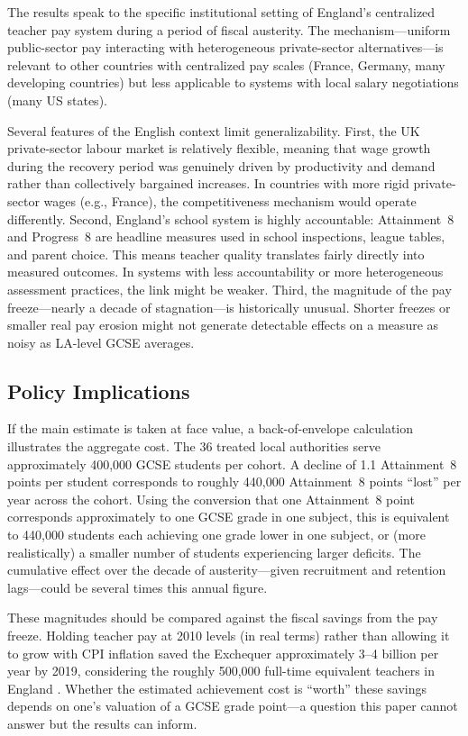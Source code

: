 \documentclass[12pt]{article}
\begin{document}
The results speak to the specific institutional setting of England's centralized teacher pay system during a period of fiscal austerity. The mechanism---uniform public-sector pay interacting with heterogeneous private-sector alternatives---is relevant to other countries with centralized pay scales (France, Germany, many developing countries) but less applicable to systems with local salary negotiations (many US states).

Several features of the English context limit generalizability. First, the UK private-sector labour market is relatively flexible, meaning that wage growth during the recovery period was genuinely driven by productivity and demand rather than collectively bargained increases. In countries with more rigid private-sector wages (e.g., France), the competitiveness mechanism would operate differently. Second, England's school system is highly accountable: Attainment~8 and Progress~8 are headline measures used in school inspections, league tables, and parent choice. This means teacher quality translates fairly directly into measured outcomes. In systems with less accountability or more heterogeneous assessment practices, the link might be weaker. Third, the magnitude of the pay freeze---nearly a decade of stagnation---is historically unusual. Shorter freezes or smaller real pay erosion might not generate detectable effects on a measure as noisy as LA-level GCSE averages.

\subsection{Policy Implications}

If the main estimate is taken at face value, a back-of-envelope calculation illustrates the aggregate cost. The 36 treated local authorities serve approximately 400,000 GCSE students per cohort. A decline of 1.1 Attainment~8 points per student corresponds to roughly 440,000 Attainment~8 points ``lost'' per year across the cohort. Using the conversion that one Attainment~8 point corresponds approximately to one GCSE grade in one subject, this is equivalent to 440,000 students each achieving one grade lower in one subject, or (more realistically) a smaller number of students experiencing larger deficits. The cumulative effect over the decade of austerity---given recruitment and retention lags---could be several times this annual figure.

These magnitudes should be compared against the fiscal savings from the pay freeze. Holding teacher pay at 2010 levels (in real terms) rather than allowing it to grow with CPI inflation saved the Exchequer approximately \textsterling{} 3--4 billion per year by 2019, considering the roughly 500,000 full-time equivalent teachers in England \citep{ifs2019teacher}. Whether the estimated achievement cost is ``worth'' these savings depends on one's valuation of a GCSE grade point---a question this paper cannot answer but the results can inform.
\end{document}
